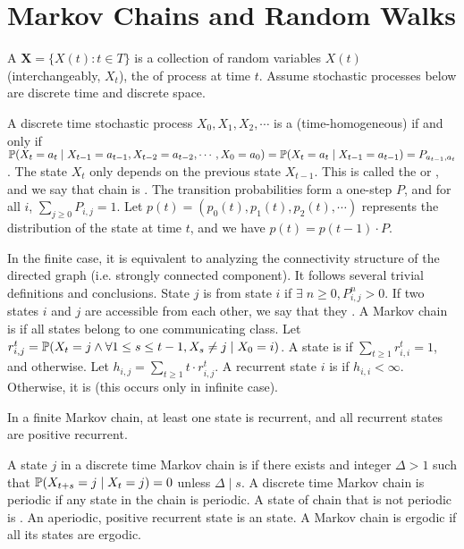 \documentclass[main.tex]{subfiles}
\begin{document}
\minispacing

\section{Markov Chains and Random Walks}

A  $\mathbf{X}=\{X(t) : t \in T\}$ is a collection of random variables $X(t)$ (interchangeably, $X_t$), the  of process at time $t$. Assume stochastic processes below are discrete time and discrete space.

A discrete time stochastic process $X_0,X_1,X_2,\cdots$ is a (time-homogeneous)  if and only if $\mathbb{P}(X_t=a_t\mid X_{t-1}=a_{t-1},X_{t-2}=a_{t-2},\cdots,X_0=a_0)=\mathbb{P}(X_t=a_t\mid X_{t-1}=a_{t-1})=P_{a_{t-1},a_{t}}$. The state $X_t$ only depends on the previous state $X_{t-1}$. This is called the  or , and we say that chain is . The transition probabilities form a one-step  $P$, and for all $i$, $\sum_{j\ge 0}P_{i,j}=1$. Let $p(t) = (p_0(t),p_1(t),p_2(t),\cdots)$ represents the distribution of the state at time $t$, and we have $p(t)=p(t-1)\cdot P$.

In the finite case, it is equivalent to analyzing the connectivity structure of the directed graph (i.e. strongly connected component). It follows several trivial definitions and conclusions. State $j$ is  from state $i$ if $\exists\;\! n\ge 0,P^n_{i,j}>0$. If two states $i$ and $j$ are accessible from each other, we say that they . A Markov chain is  if all states belong to one communicating class. Let $r^t_{i,j}=\mathbb{P}(X_t=j \wedge \forall 1\le s\le t-1,X_s\not=j \mid X_0=i)$. A state is  if $\sum_{t\ge 1}r^t_{i,i}=1$, and  otherwise. Let $h_{i,j}=\sum_{t\ge 1}t\cdot r^t_{i,j}$. A recurrent state $i$ is  if $h_{i,i}<\infty$. Otherwise, it is  (this occurs only in infinite case).

\begin{lemma}
    In a finite Markov chain, at least one state is recurrent, and all recurrent states are positive recurrent.
\end{lemma}

A state $j$ in a discrete time Markov chain is  if there exists and integer $\Delta > 1$ such that $\mathbb{P}(X_{t+s}=j\mid X_t=j)=0$ unless $\Delta \mid s$. A discrete time Markov chain is periodic if any state in the chain is periodic. A state of chain that is not periodic is . An aperiodic, positive recurrent state is an  state. A Markov chain is ergodic if all its states are ergodic.
\end{document}
